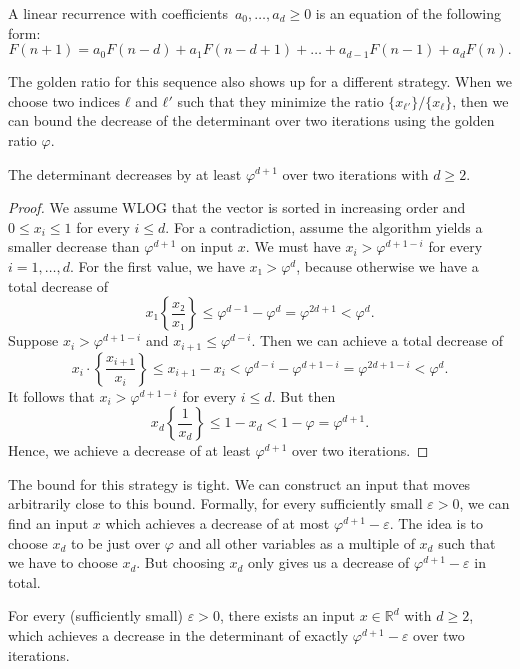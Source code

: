 \begin{definition}
  A linear recurrence with coefficients~$a_0, \dots, a_d ≥ 0$ is an equation of the
  following form:
  \[
    F(n + 1) = a_0 F(n - d) + a_1 F(n - d + 1) + \dots + a_{d-1} F(n - 1) + a_d F(n).
  \]
\end{definition}

\iffalse %
The golden ratio for this sequence also shows up for a different strategy.
When we choose two indices $ℓ$ and $ℓ'$ such that they minimize the ratio
$\{x_{ℓ'}\}/\{x_{ℓ}\}$, then we can bound the decrease of the determinant over
two iterations using the golden ratio $φ$.

\begin{theorem}
  The determinant decreases by at least $φ^{d+1}$ over two iterations with $d ≥ 2$.
\end{theorem}

\begin{proof}
  We assume WLOG that the vector is sorted in increasing order and
  $0 ≤ x_i ≤ 1$ for every $i ≤ d$.
  For a contradiction, assume the algorithm yields a smaller decrease than $φ^{d+1}$ on input $x$.
  We must have $x_i > φ^{d+1-i}$ for every $i = 1, \dots, d$.
  For the first value, we have $x₁ > φ^d$, because otherwise we have a total decrease of
  \[
    x₁ \left\{ \frac{x₂}{x₁} \right\} ≤ φ^{d-1} - φ^d = φ^{2d+1} < φ^d.
  \]
  Suppose $x_i > φ^{d+1-i}$ and $x_{i+1} ≤ φ^{d-i}$.
  Then we can achieve a total decrease of
  \[
    x_i · \left\{ \frac{x_{i+1}}{x_i} \right\} ≤ x_{i+1} - x_i < φ^{d-i} - φ^{d+1-i} = φ^{2d+1-i} < φ^d.
  \]
  It follows that $x_i > φ^{d+1-i}$ for every $i ≤ d$.
  But then
  \[
    x_d \left\{ \frac{1}{x_d} \right\} ≤ 1 - x_d < 1 - φ = φ^{d+1}.
  \]
  Hence, we achieve a decrease of at least $φ^{d+1}$ over two iterations.
\end{proof}

The bound for this strategy is tight.
We can construct an input that moves arbitrarily close to this bound.
Formally, for every sufficiently small $ε > 0$, we can find an input $x$ which
achieves a decrease of at most $φ^{d+1} - ε$.
The idea is to choose $x_d$ to be just over $φ$ and all other variables as a multiple of $x_d$
such that we have to choose $x_d$.
But choosing $x_d$ only gives us a decrease of $φ^{d+1} - ε$ in total.

\begin{theorem}
  For every (sufficiently small) $ε > 0$,
  there exists an input $x ∈ ℝ^d$ with $d ≥ 2$,
  which achieves a decrease in the determinant of exactly $φ^{d+1} - ε$ over two
  iterations.
\end{theorem}

